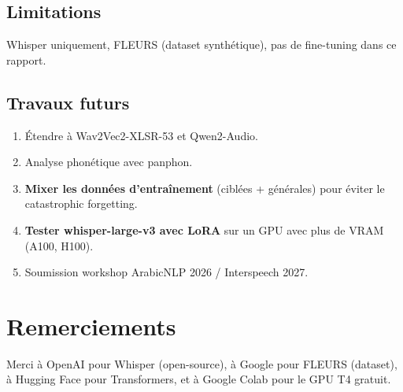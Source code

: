 \documentclass[11pt,a4paper]{article}
\begin{document}
\subsection{Limitations}

Whisper uniquement, FLEURS (dataset synthétique), pas de fine-tuning dans ce
rapport.

\subsection{Travaux futurs}

\begin{enumerate}
	\item Étendre à Wav2Vec2-XLSR-53 et Qwen2-Audio.
	\item Analyse phonétique avec panphon.
	\item \textbf{Mixer les données d'entraînement} (ciblées + générales)
	pour éviter le catastrophic forgetting.
	\item \textbf{Tester whisper-large-v3 avec LoRA} sur un GPU avec plus
	de VRAM (A100, H100).
	\item Soumission workshop ArabicNLP 2026 / Interspeech 2027.
\end{enumerate}


\section*{Remerciements}

Merci à OpenAI pour Whisper (open-source), à Google pour FLEURS (dataset),
à Hugging Face pour Transformers, et à Google Colab pour le GPU T4 gratuit.
\end{document}
